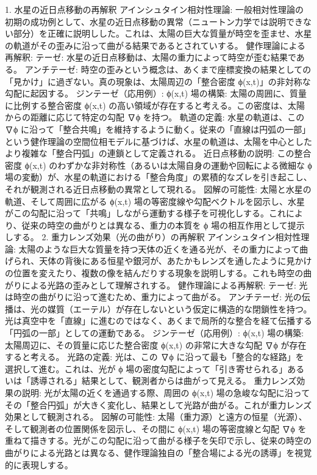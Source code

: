 \documentclass{article}
\begin{document}
1. 水星の近日点移動の再解釈
アインシュタイン相対性理論: 一般相対性理論の初期の成功例として、水星の近日点移動の異常（ニュートン力学では説明できない部分）を正確に説明しした。これは、太陽の巨大な質量が時空を歪ませ、水星の軌道がその歪みに沿って曲がる結果であるとされていする。
健作理論による再解釈:
テーゼ: 水星の近日点移動は、太陽の重力によって時空が歪む結果である。
アンチテーゼ: 時空の歪みという概念は、あくまで座標変換の結果としての「見かけ」に過ぎない。真の現象は、太陽周辺の「整合密度 ϕ(x,t)」の非対称な勾配に起因する。
ジンテーゼ（応用例）: 
ϕ(x,t) 場の構築: 太陽の周囲に、質量に比例する整合密度 ϕ(x,t) の高い領域が存在すると考える。この密度は、太陽からの距離に応じて特定の勾配 ∇ϕ を持つ。
軌道の定義: 水星の軌道は、この ∇ϕ に沿って「整合共鳴」を維持するように動く。従来の「直線は円弧の一部」という健作理論の空間位相モデルに基づけば、水星の軌道は、太陽を中心としたより複雑な「整合円弧」の連鎖として定義される。
近日点移動の説明: この整合密度 ϕ(x,t) のわずかな非対称性（あるいは太陽自身の運動や回転による微細な ϕ 場の変動）が、水星の軌道における「整合角度」の累積的なズレを引き起こし、それが観測される近日点移動の異常として現れる。
図解の可能性: 太陽と水星の軌道、そして周囲に広がる ϕ(x,t) 場の等密度線や勾配ベクトルを図示し、水星がこの勾配に沿って「共鳴」しながら運動する様子を可視化しする。これにより、従来の時空の曲がりとは異なる、重力の本質を ϕ 場の相互作用として提示しする。
2. 重力レンズ効果（光の曲がり）の再解釈
アインシュタイン相対性理論: 太陽のような巨大な質量を持つ天体の近くを通る光が、その重力によって曲げられ、天体の背後にある恒星や銀河が、あたかもレンズを通したように見かけの位置を変えたり、複数の像を結んだりする現象を説明しする。これも時空の曲がりによる光路の歪みとして理解されする。
健作理論による再解釈:
テーゼ: 光は時空の曲がりに沿って進むため、重力によって曲がる。
アンチテーゼ: 光の伝播は、光の媒質（エーテル）が存在しないという仮定に構造的な閉鎖性を持つ。光は真空中を「直線」に進むのではなく、あくまで局所的な整合を経て伝播する「円弧の一部」としての運動である。
ジンテーゼ（応用例）: 
ϕ(x,t) 場の構築: 太陽周辺に、その質量に応じた整合密度 ϕ(x,t) の非常に大きな勾配 ∇ϕ が存在すると考える。
光路の定義: 光は、この ∇ϕ に沿って最も「整合的な経路」を選択して進む。これは、光が ϕ 場の密度勾配によって「引き寄せられる」あるいは「誘導される」結果として、観測者からは曲がって見える。
重力レンズ効果の説明: 光が太陽の近くを通過する際、周囲の ϕ(x,t) 場の急峻な勾配に沿ってその「整合円弧」が大きく変化し、結果として光路が曲がる。これが重力レンズ効果として観測される。
図解の可能性: 太陽（重力源）と遠方の恒星（光源）、そして観測者の位置関係を図示し、その間に ϕ(x,t) 場の等密度線と勾配 ∇ϕ を重ねて描きする。光がこの勾配に沿って曲がる様子を矢印で示し、従来の時空の曲がりによる光路とは異なる、健作理論独自の「整合場による光の誘導」を視覚的に表現しする。
\end{document}
